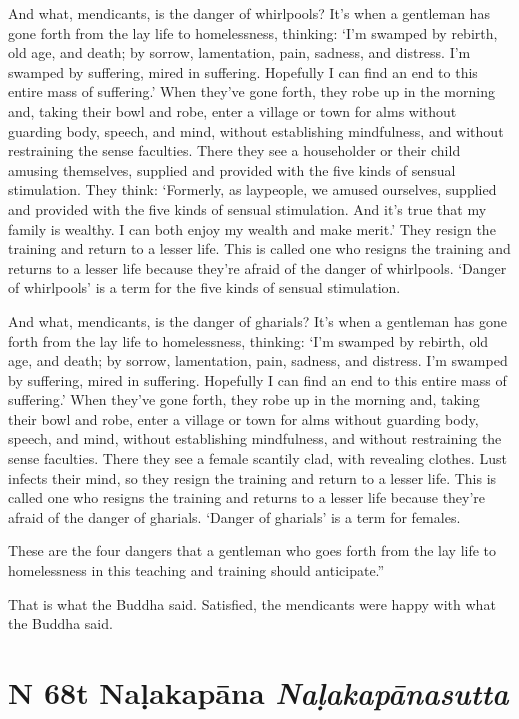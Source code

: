 \documentclass[12pt,openany]{book}%
\newcommand*{\suttatitleacronym}[1]{\smaller[2]{#1}\vspace*{.3em}}
\newcommand*{\suttatitletranslation}[1]{\linebreak{#1}}
\newcommand*{\suttatitleroot}[1]{\linebreak\smaller[2]\itshape{#1}}
\newcommand*{\tocacronym}[1]{\hspace*{-3.3em}{#1}\quad}
\newcommand*{\toctranslation}[1]{#1}
\newcommand*{\tocroot}[1]{(\textit{#1})}
\begin{document}
And what, mendicants, is the danger of whirlpools? It’s when a gentleman has gone forth from the lay life to homelessness, thinking: ‘I’m swamped by rebirth, old age, and death; by sorrow, lamentation, pain, sadness, and distress. I’m swamped by suffering, mired in suffering. Hopefully I can find an end to this entire mass of suffering.’ When they’ve gone forth, they robe up in the morning and, taking their bowl and robe, enter a village or town for alms without guarding body, speech, and mind, without establishing mindfulness, and without restraining the sense faculties. There they see a householder or their child amusing themselves, supplied and provided with the five kinds of sensual stimulation. They think: ‘Formerly, as laypeople, we amused ourselves, supplied and provided with the five kinds of sensual stimulation. And it’s true that my family is wealthy. I can both enjoy my wealth and make merit.’ They resign the training and return to a lesser life. This is called one who resigns the training and returns to a lesser life because they’re afraid of the danger of whirlpools. ‘Danger of whirlpools’ is a term for the five kinds of sensual stimulation. 

And what, mendicants, is the danger of gharials? It’s when a gentleman has gone forth from the lay life to homelessness, thinking: ‘I’m swamped by rebirth, old age, and death; by sorrow, lamentation, pain, sadness, and distress. I’m swamped by suffering, mired in suffering. Hopefully I can find an end to this entire mass of suffering.’ When they’ve gone forth, they robe up in the morning and, taking their bowl and robe, enter a village or town for alms without guarding body, speech, and mind, without establishing mindfulness, and without restraining the sense faculties. There they see a female scantily clad, with revealing clothes. Lust infects their mind, so they resign the training and return to a lesser life. This is called one who resigns the training and returns to a lesser life because they’re afraid of the danger of gharials. ‘Danger of gharials’ is a term for females. 

These are the four dangers that a gentleman who goes forth from the lay life to homelessness in this teaching and training should anticipate.” 

That is what the Buddha said. Satisfied, the mendicants were happy with what the Buddha said. 

%
\section*{{\suttatitleacronym MN 68}{\suttatitletranslation At Naḷakapāna }{\suttatitleroot Naḷakapānasutta}}
\addcontentsline{toc}{section}{\tocacronym{MN 68} \toctranslation{At Naḷakapāna } \tocroot{Naḷakapānasutta}}
\end{document}
